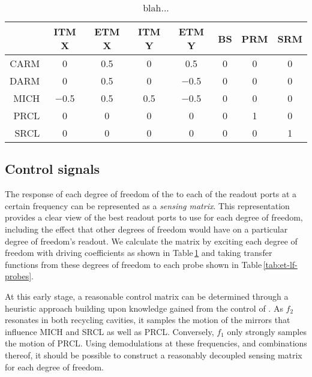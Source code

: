 \begin{table}
  \centering
  \begin{tabular}{r|ccccccc}
    & \textbf{\gls{ITM} X} & \textbf{\gls{ETM} X} & \textbf{\gls{ITM} Y} & \textbf{\gls{ETM} Y} & \textbf{\gls{BS}} & \textbf{\gls{PRM}} & \textbf{\gls{SRM}} \\
    \hline
    \gls{CARM} & \num{0} & \num{0.5} & \num{0} & \num{0.5} & \num{0} & \num{0} & \num{0} \\
    \gls{DARM} & \num{0} & \num{0.5} & \num{0} & \num{-0.5} & \num{0} & \num{0} & \num{0} \\
    \gls{MICH} & \num{-0.5} & \num{0.5} & \num{0.5} & \num{-0.5} & \num{0} & \num{0} & \num{0} \\
    \gls{PRCL} & \num{0} & \num{0} & \num{0} & \num{0} & \num{0} & \num{1} & \num{0} \\
    \gls{SRCL} & \num{0} & \num{0} & \num{0} & \num{0} & \num{0} & \num{0} & \num{1} \\
  \end{tabular}
  \caption{\label{tab:et-lf-driving-coefficients}blah...}
\end{table}

\subsection{Control signals}
The response of each degree of freedom of the \DRFPMI{} to each of the readout ports at a certain frequency can be represented as a \emph{sensing matrix}. This representation provides a clear view of the best readout ports to use for each degree of freedom, including the effect that other degrees of freedom would have on a particular degree of freedom's readout. We calculate the matrix by exciting each degree of freedom with driving coefficients as shown in Table\,\ref{tab:et-lf-driving-coefficients} and taking transfer functions from these degrees of freedom to each probe shown in Table\,\ref{tab:et-lf-probes}.

At this early stage, a reasonable control matrix can be determined through a heuristic approach building upon knowledge gained from the control of \ALIGO{}. As $f_2$ resonates in both recycling cavities, it samples the motion of the mirrors that influence \gls{MICH} and \gls{SRCL} as well as \gls{PRCL}. Conversely, $f_1$ only strongly samples the motion of \gls{PRCL}. Using demodulations at these frequencies, and combinations thereof, it should be possible to construct a reasonably decoupled sensing matrix for each degree of freedom.

